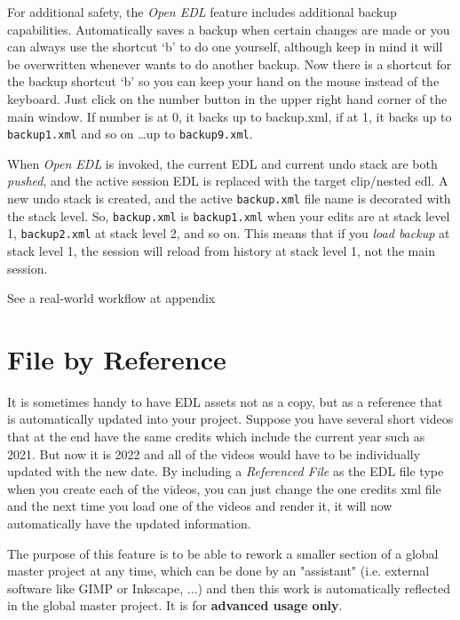 For additional safety, the \textit{Open EDL} feature includes
additional backup capabilities. Automatically \CGG{} saves a backup 
when certain changes are made or you can always use the shortcut `b'
to do one yourself, although keep in mind it will be overwritten
whenever \CGG{} wants to do another backup.  Now there is a shortcut
for the backup shortcut `b' so you can keep your hand on the mouse
instead of the keyboard.  Just click on the number button in the upper right
hand corner of the main window.  If number is at 0, it backs up to
backup.xml, if at 1, it backs up to \texttt{backup1.xml} and so on
\dots up to \texttt{backup9.xml}.

When \textit{Open EDL} is invoked, the current EDL and current undo
stack are both \textit{pushed}, and the active session EDL is
replaced with the target clip/nested edl.  A new undo stack is
created, and the active \texttt{backup.xml} file name is decorated
with the stack level.  So, \texttt{backup.xml} is
\texttt{backup1.xml} when your edits are at stack level 1,
\texttt{back\-up2\-.xml} at stack level 2, and so on.  This means
that if you \textit{load backup} at stack level 1, the session will
reload from history at stack level 1, not the main session.

See a real-world workflow at appendix 

\section{File by Reference}%
\label{sec:file_by_reference}

It is sometimes handy to have EDL  assets not as a copy, but as a
reference that is automatically updated into your project.  Suppose
you have several short videos that at the end have the same credits
which include the current year such as 2021.  But now it is 2022 and
all of the videos would have to be individually updated with the new
date.  By including a \textit{Referenced File} as the EDL file type
when you create each of the videos, you can just change the one
credits xml file and the next time you load one of the videos and
render it, it will now automatically have the updated information.

The purpose of this feature is to be able to rework a smaller
section of a global master project at any time, which can be done by
an "assistant" (i.e. external software like GIMP or Inkscape, $\dots$) and then this work is automatically reflected in the
global master project.  It is for \textbf{advanced usage only}.

